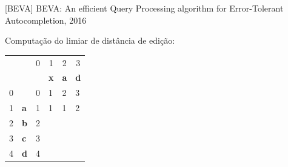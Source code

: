 \documentclass[11pt]{beamer}
\begin{document}
\begin{frame}{[BEVA] BEVA: An efficient Query Processing algorithm for Error-Tolerant Autocompletion, 2016}

    Computação do limiar de distância de edição:
  
    \begin{table}[]
    \begin{tabular}{llllll}
     &  & \multicolumn{1}{c}{{\color[HTML]{656565} 0}} & \multicolumn{1}{c}{{\color[HTML]{656565} 1}} & \multicolumn{1}{c}{{\color[HTML]{656565} 2}} & \multicolumn{1}{c}{{\color[HTML]{656565} 3}} \\
     &  &  & \textbf{x} & \textbf{a} & \textbf{d} \\ \cline{3-6} 
    {\color[HTML]{656565} 0} & \multicolumn{1}{l|}{} & \multicolumn{1}{l|}{{\color[HTML]{000000} 0}} & \multicolumn{1}{l|}{{\color[HTML]{000000} 1}} & \multicolumn{1}{l|}{{\color[HTML]{000000} 2}} & \multicolumn{1}{l|}{{\color[HTML]{000000} 3}} \\ \cline{3-6} 
    {\color[HTML]{656565} 1} & \multicolumn{1}{l|}{\textbf{a}} & \multicolumn{1}{l|}{{\color[HTML]{000000} 1}} & \multicolumn{1}{l|}{{\color[HTML]{000000} 1}} & \multicolumn{1}{l|}{{\color[HTML]{000000} 1}} & \multicolumn{1}{l|}{{\color[HTML]{000000} 2}} \\ \cline{3-6} 
    {\color[HTML]{656565} 2} & \multicolumn{1}{l|}{\textbf{b}} & \multicolumn{1}{c|}{{\color[HTML]{000000} 2}} & \multicolumn{1}{c|}{{\color[HTML]{000000} }} & \multicolumn{1}{c|}{{\color[HTML]{000000} }} & \multicolumn{1}{c|}{{\color[HTML]{000000} }} \\ \cline{3-6} 
    {\color[HTML]{656565} 3} & \multicolumn{1}{l|}{\textbf{c}} & \multicolumn{1}{l|}{{\color[HTML]{000000} 3}} & \multicolumn{1}{l|}{{\color[HTML]{000000} }} & \multicolumn{1}{l|}{{\color[HTML]{000000} }} & \multicolumn{1}{l|}{{\color[HTML]{000000} }} \\ \cline{3-6} 
    {\color[HTML]{656565} 4} & \multicolumn{1}{l|}{\textbf{d}} & \multicolumn{1}{c|}{{\color[HTML]{000000} 4}} & \multicolumn{1}{c|}{{\color[HTML]{000000} }} & \multicolumn{1}{c|}{{\color[HTML]{000000} }} & \multicolumn{1}{c|}{{\color[HTML]{000000} }} \\ \cline{3-6} 
    \end{tabular}
    \end{table}
    
\end{frame}
\end{document}
